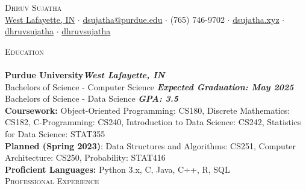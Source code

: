 \documentclass[a4paper]{article}
\newcommand{\lineunder} {
    \vspace*{-8pt} \\
    \hspace*{-18pt} \hrulefill \\
}
\newcommand{\header} [1] {
    {\hspace*{-18pt}\vspace*{6pt} \textsc{#1}}
    \vspace*{-6pt} \lineunder
}
\begin{document}
\vspace*{-40pt}

    

\vspace*{-10pt}
\begin{center}
	{\Huge \scshape {Dhruv Sujatha}}\\
	\href{https://www.google.com/maps/place/West+Lafayette,+IN/}{West Lafayette, IN} $\cdot$ \href{mailto:dsujatha@purdue.edu}{dsujatha@purdue.edu} $\cdot$ (765) 746-9702 $\cdot$ \href{https://dsujatha.xyz}{dsujatha.xyz} $\cdot$ \href{https://www.linkedin.com/in/dhruvsujatha/}{\faLinkedinSquare \hspace{2pt} dhruvsujatha} $\cdot$ \href{https://github.com/dhruvsujatha}{\faGithub \hspace{2pt} dhruvsujatha}\\
\end{center}

\header{Education}
\textbf{Purdue University}\hfill \textbf{\textit {West Lafayette, IN}}\\
Bachelor\textquotesingle{}s of Science - Computer Science \hfill \textbf{\textit {Expected Graduation: May 2025}}\\
Bachelor\textquotesingle{}s of Science - Data Science \hfill \textbf{\textit{GPA: 3.5}}\\
\vspace{1mm}
\textbf{Coursework:} Object-Oriented Programming: CS180, Discrete Mathematics: CS182, C-Programming: CS240, Introduction to Data Science: CS242, Statistics for Data Science: STAT355\\
\vspace{1mm}
\textbf{Planned (Spring 2023)}: Data Structures and Algorithms: CS251, Computer Architecture: CS250, Probability: STAT416\\
\vspace{1mm}
\textbf{Proficient Languages:} Python 3.x, C, Java, C++, R, SQL
\vspace{1mm}\\
\header{Professional Experience}
\end{document}
